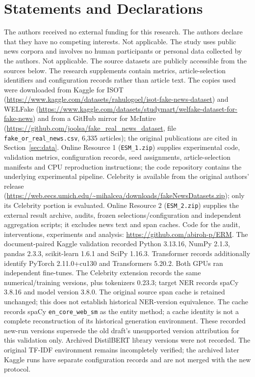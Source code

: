 \section*{Statements and Declarations}
 The authors received no external funding for this research.
 The authors declare that they have no competing interests.
 Not applicable. The study uses public news corpora and involves no human participants or personal data collected by the authors.
 Not applicable.
 The source datasets are publicly accessible from the sources below. The research supplements contain metrics, article-selection identifiers and configuration records rather than article text. The copies used were downloaded from Kaggle for ISOT (\url{https://www.kaggle.com/datasets/rahulogoel/isot-fake-news-dataset}) and WELFake (\url{https://www.kaggle.com/datasets/studymart/welfake-dataset-for-fake-news}) and from a GitHub mirror for McIntire (\url{https://github.com/joolsa/fake_real_news_dataset}, file \texttt{fake\_or\_real\_news.csv}, 6,335 articles); the original publications are cited in Section~\ref{sec:data}. Online Resource 1 (\texttt{ESM\_1.zip}) supplies experimental code, validation metrics, configuration records, seed assignments, article-selection manifests and CPU reproduction instructions; the code repository contains the underlying experimental pipeline.
Celebrity is available from the original authors' release (\url{https://web.eecs.umich.edu/~mihalcea/downloads/fakeNewsDatasets.zip}); only its Celebrity portion is evaluated. Online Resource 2 (\texttt{ESM\_2.zip}) supplies the external result archive, audits, frozen selections/configuration and independent aggregation scripts; it excludes news text and span caches.
 Code for the audit, interventions, experiments and analysis: \url{https://github.com/abiroh-p/ERM}.
 The document-paired Kaggle validation recorded Python 3.13.16, NumPy 2.1.3, pandas 2.3.3, scikit-learn 1.6.1 and SciPy 1.16.3. Transformer records additionally identify PyTorch 2.11.0+cu130 and Transformers 5.20.2. Both GPUs ran independent fine-tunes. The Celebrity extension records the same numerical/training versions, plus tokenizers 0.23.3; target NER records spaCy 3.8.16 and model version 3.8.0. The original source span cache is retained unchanged; this does not establish historical NER-version equivalence. The cache records spaCy \texttt{en\_core\_web\_sm} as the entity method; a cache identity is not a complete reconstruction of its historical generation environment. These recorded new-run versions supersede the old draft's unsupported version attribution for this validation only. Archived DistilBERT library versions were not recorded. The original TF-IDF environment remains incompletely verified; the archived later Kaggle runs have separate configuration records and are not merged with the new protocol.
